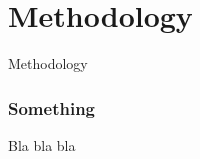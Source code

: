 \section{Methodology}

\begin{frame}
     \begin{center}
     	\huge Methodology
     \end{center}
\end{frame}

\begin{frame}
	\frametitle{Something}
	Bla bla bla  
\end{frame}